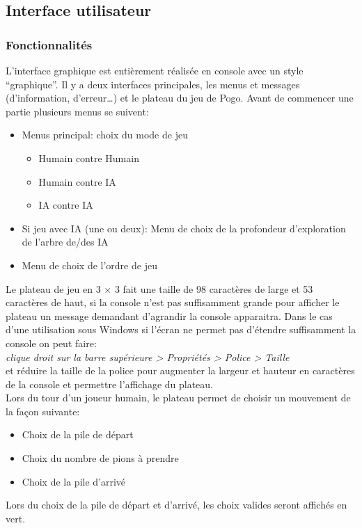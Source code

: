 \documentclass[article, backcover, french, nodocumentinfo]{upmethodology-document}
\begin{document}
		\subsection{Interface utilisateur}
			\subsubsection{Fonctionnalités}
				L'interface graphique est entièrement réalisée en console avec un style ``graphique''. Il y a deux interfaces principales, les menus et messages (d'information, d'erreur\ldots) et le plateau du jeu de Pogo.
					Avant de commencer une partie plusieurs menus se suivent:
					\begin{itemize}
						\item Menus principal: choix du mode de jeu
							\begin{itemize}
								\item Humain contre Humain
								\item Humain contre IA
								\item IA contre IA
							\end{itemize}
						\item Si jeu avec IA (une ou deux): Menu de choix de la profondeur d'exploration de l'arbre de/des IA
						\item Menu de choix de l'ordre de jeu
					\end{itemize}
					Le plateau de jeu en 3 $\times$ 3 fait une taille de 98 caractères de large et 53 caractères de haut, si la console n'est pas suffisamment grande pour afficher le plateau un message demandant d'agrandir la console apparaitra. Dans le cas d'une utilisation sous Windows si l'écran ne permet pas d'étendre suffisamment la console on peut faire:\\
					\textit{clique droit sur la barre supérieure > Propriétés > Police > Taille}\\
					et réduire la taille de la police pour augmenter la largeur et hauteur en caractères de la console et permettre l'affichage du plateau.\\

					Lors du tour d'un joueur humain, le plateau permet de choisir un mouvement de la façon suivante:
					\begin{itemize}
						\item Choix de la pile de départ
						\item Choix du nombre de pions à prendre
						\item Choix de la pile d'arrivé
					\end{itemize}
					Lors du choix de la pile de départ et d'arrivé, les choix valides seront affichés en vert.
\end{document}
